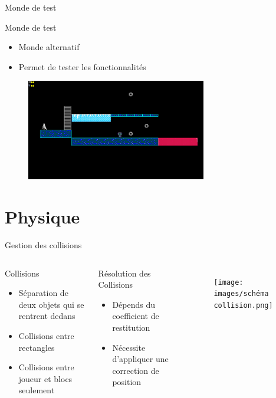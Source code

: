 \documentclass{beamer}
\begin{document}
{\begin{frame}{Monde de test}
    \begin{block}{Monde de test}
        \begin{itemize}
            \item[\bullet] Monde alternatif
            \item[\bullet] Permet de tester les fonctionnalités
        \end{itemize}
    \end{block}
    \begin{figure}
        \centering
        \includegraphics[width=0.7\textwidth]{test_world}
    \end{figure}
\end{frame}

\section{Physique}
\begin{frame}{Gestion des collisions}
    \begin{columns}
        \begin{block}{Collisions}
            \begin{itemize}
                \item[\bullet] Séparation de deux objets qui se rentrent dedans
                \item[\bullet] Collisions entre rectangles
                \item[\bullet] Collisions entre joueur et blocs seulement
            \end{itemize}
        \end{block}
        \begin{block}{Résolution des Collisions}
            \begin{itemize}
                \item[\bullet] Dépends du coefficient de restitution
                \item[\bullet] Nécessite d'appliquer une correction de position
            \end{itemize}
        \end{block}
        \begin{figure}
            \centering
            \texttt{[image: images/schéma collision.png]}
        \end{figure}
    \end{columns}
\end{frame}

}
\end{document}
